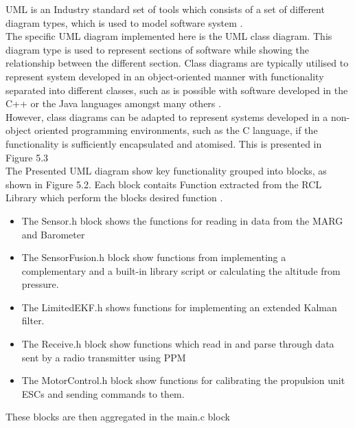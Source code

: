 \documentclass[12pt,a4paper,twoside]{report}
\begin{document}
				UML is an Industry standard set of tools which consists of a set of different diagram types, which is used to model software system \cite{30}.
				\\
				The specific UML diagram implemented here is the UML class diagram. This diagram type is used to represent sections of software while showing the relationship between the different section. Class diagrams are typically utilised to represent system developed in an object-oriented manner with functionality separated into different classes, such as is possible with software developed in the C++ or the Java languages amongst many others \cite{30}. 
				\\
				However, class diagrams can be adapted to represent systems developed in a non-object oriented programming environments, such as the C language, if the functionality is sufficiently encapsulated and atomised. This is presented in Figure 5.3
				\\
				The Presented UML diagram show key functionality grouped into blocks, as shown in Figure 5.2. Each block contaits Function extracted from the RCL Library which perform the blocks desired function \cite{31}.
				\\
				\begin{itemize}
					
					\item 
						The Sensor.h block shows the functions for reading in data from the MARG and Barometer
					\item 
						The SensorFusion.h block show functions from implementing a complementary and a built-in library script or calculating the altitude from pressure.
					\item
						The LimitedEKF.h shows functions for implementing an extended Kalman filter.
					\item
						The Receive.h block show functions which read in and parse through data sent by a radio transmitter using PPM
					\item
						The MotorControl.h block show functions for calibrating the propulsion unit ESCs and sending commands to them.
				\end{itemize}
			
				These blocks are then aggregated in the main.c block
				\\
				
\end{document}
